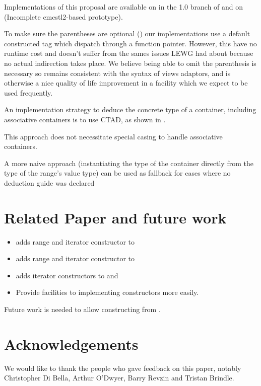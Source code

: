 \documentclass{wg21}
\begin{document}
Implementations of this proposal are available on in the 1.0 branch of \cite{Range V3} and on \cite{Compiler Explorer} (Incomplete cmcstl2-based prototype).

To make sure the parentheses are optional () our implementations use a default constructed 
tag which dispatch through a function pointer.
However, this have no runtime cost 
and doesn't suffer from the sames issues LEWG had about  because no actual indirection takes place.
We believe being able to omit the parenthesis is necessary so  remains consistent with the syntax of views adaptors, 
and is otherwise a nice quality of life improvement in a facility which we expect to be used frequently.

An implementation strategy to deduce the concrete type of a container, including associative containers is to use CTAD, as shown in \cite{CTAD}.

This approach does not necessitate special casing to handle associative containers.

A more naive approach (instantiating the type of the container directly from the type of the range's value type) can be used as fallback for cases where no deduction guide was declared


\section{Related Paper and future work}

\begin{itemize}
	\item \cite{P1391} adds range and iterator constructor to 
	\item \cite{P1394} adds range and iterator constructor to 
    \item \cite{P1425} adds iterator constructors to  and 
    \item \cite{P1419} Provide facilities to implementing  constructors more easily.
\end{itemize}

Future work is needed to allow constructing  from .

\section{Acknowledgements}
We would like to thank the people who gave feedback on this paper, notably Christopher Di Bella, Arthur O'Dwyer, Barry Revzin
and Tristan Brindle.\\
\end{document}
